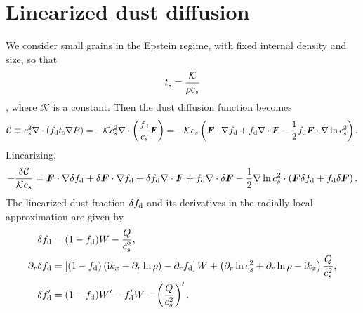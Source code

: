 \section{Linearized dust diffusion}\label{lin_dust}
We consider small grains in the Epstein regime, with fixed internal
density and size, so that
\begin{align}
  t_\mathrm{s}   =   \frac{\mathcal{K}}{\rho c_s}\label{epstein}
\end{align}
\citep{price15}, where $\mathcal{K}$ is a constant. Then the dust diffusion
function becomes
\begin{align}
  \mathcal{C} \equiv c_s^2\nabla\cdot\left(f_\mathrm{d}t_\mathrm{s}\nabla
  P\right) = - \mathcal{K} c_s^2 \nabla\cdot
  \left(\frac{f_\mathrm{d}}{c_s}\bm{F}\right) =
  -\mathcal{K}c_s \left(\bm{F}\cdot\nabla f_\mathrm{d} + f_\mathrm{d} \nabla\cdot\bm{F}
  - \frac{1}{2}f_\mathrm{d}\bm{F}\cdot\nabla\ln{c_s^2}\right).  
\end{align}
Linearizing,
\begin{align}
  - \frac{\delta\mathcal{C}}{\mathcal{K}c_s} = \bm{F}\cdot\nabla\delta f_\mathrm{d} +
  \delta\bm{F}\cdot\nabla f_\mathrm{d} + \delta f_\mathrm{d}\nabla\cdot\bm{F} +
  f_\mathrm{d}\nabla\cdot\delta\bm{F} -
  \frac{1}{2}\nabla\ln{c_s^2}\cdot\left(\bm{F}\delta f_\mathrm{d} + f_\mathrm{d}
  \delta\bm{F}\right). 
\end{align}
The linearized dust-fraction $\delta f_\mathrm{d}$ and its derivatives in the
radially-local approximation are given by
\begin{align}
  \delta f_\mathrm{d}      &= (1-f_\mathrm{d})W - \frac{Q}{c_s^2}, \\
  \partial_r\delta f_\mathrm{d} &= \left[(1-f_\mathrm{d})\left(\mathrm{i} k_x -
    \partial_r\ln{\rho}\right) - \partial_rf_\mathrm{d}\right]W + \left(\partial_r\ln{c_s^2}
  + \partial_r\ln{\rho} - \mathrm{i} k_x \right)\frac{Q}{c_s^2},\\
  \delta f_\mathrm{d}^\prime &= (1-f_\mathrm{d})W^\prime - f_\mathrm{d}^\prime W -
  \left(\frac{Q}{c_s^2}\right)^\prime. 
\end{align}


